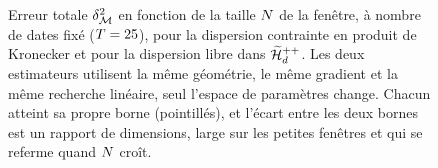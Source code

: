 %
\begin{figure}[htbp]
  \centering
  
  \provStructureVsNQR[.5cm]
  \caption{Erreur totale $\delta^2_{\mathcal{M}}$ en fonction de la taille $N$
  de la fenêtre, à nombre de dates fixé ($T=25$), pour la dispersion
  contrainte en produit de Kronecker et pour la dispersion libre dans
  $\widetilde{\mathcal{H}}_{d}^{++}$. Les deux estimateurs utilisent la même géométrie, le même
  gradient et la même recherche linéaire, seul l'espace de paramètres change.
  Chacun atteint sa propre borne (pointillés), et l'écart entre les deux bornes
  est un rapport de dimensions, large sur les petites fenêtres et qui se
  referme quand $N$ croît. \provStructureVsN}
  \label{fig:detection-online-structure}
\end{figure}

